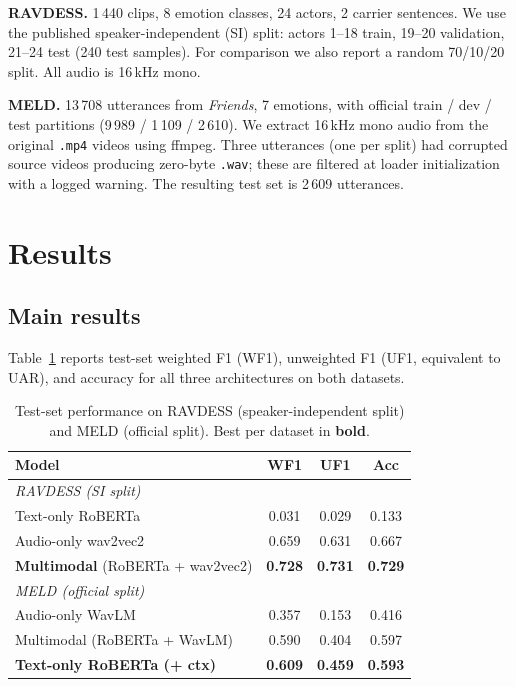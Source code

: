 \documentclass[a4paper,10pt]{article}
\begin{document}
\textbf{RAVDESS.} 1\,440 clips, 8 emotion classes, 24 actors, 2 carrier
sentences. We use the published speaker-independent (SI) split: actors
1--18 train, 19--20 validation, 21--24 test (240 test samples). For
comparison we also report a random 70/10/20 split. All audio is 16\,kHz mono.

\textbf{MELD.} 13\,708 utterances from \emph{Friends}, 7 emotions, with
official train / dev / test partitions (9\,989 / 1\,109 / 2\,610). We
extract 16\,kHz mono audio from the original \texttt{.mp4} videos using
ffmpeg. Three utterances (one per split) had corrupted source videos
producing zero-byte \texttt{.wav}; these are filtered at loader
initialization with a logged warning. The resulting test set is 2\,609
utterances.

\section{Results}

\subsection{Main results}

Table~\ref{tab:main} reports test-set weighted F1 (WF1), unweighted F1
(UF1, equivalent to UAR), and accuracy for all three architectures on both
datasets.

\begin{table}[t]
\centering
\caption{Test-set performance on RAVDESS (speaker-independent split) and
MELD (official split). Best per dataset in \textbf{bold}.}
\label{tab:main}
\small
\begin{tabular}{lccc}
\toprule
\textbf{Model} & \textbf{WF1} & \textbf{UF1} & \textbf{Acc} \\
\midrule
\multicolumn{4}{l}{\emph{RAVDESS (SI split)}} \\
Text-only RoBERTa & 0.031 & 0.029 & 0.133 \\
Audio-only wav2vec2 & 0.659 & 0.631 & 0.667 \\
\textbf{Multimodal} (RoBERTa + wav2vec2) & \textbf{0.728} & \textbf{0.731} & \textbf{0.729} \\
\midrule
\multicolumn{4}{l}{\emph{MELD (official split)}} \\
Audio-only WavLM & 0.357 & 0.153 & 0.416 \\
Multimodal (RoBERTa + WavLM) & 0.590 & 0.404 & 0.597 \\
\textbf{Text-only RoBERTa (+ ctx)} & \textbf{0.609} & \textbf{0.459} & \textbf{0.593} \\
\bottomrule
\end{tabular}
\end{table}
\end{document}
